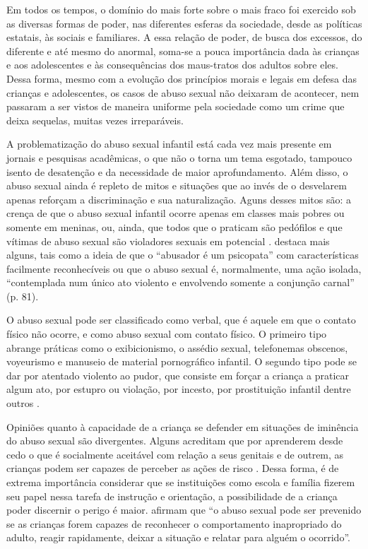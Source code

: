 \begin{citacao}
	Em todos os tempos, o domínio do mais forte sobre o mais fraco foi exercido sob as diversas formas de poder, nas diferentes esferas da sociedade, desde as políticas estatais, às sociais e familiares. A essa relação de poder, de busca dos excessos, do diferente e até mesmo do anormal, soma-se a pouca importância dada às crianças e aos adolescentes e às consequências dos maus-tratos dos adultos sobre eles. Dessa forma, mesmo com a evolução dos princípios morais e legais em defesa das crianças e adolescentes, os casos de abuso sexual não deixaram de acontecer, nem passaram a ser vistos de maneira uniforme pela sociedade como um crime que deixa sequelas, muitas vezes irreparáveis.
\end{citacao}

A problematização do abuso sexual infantil está cada vez mais presente em jornais e pesquisas acadêmicas, o que não o torna um tema esgotado, tampouco isento de desatenção e da necessidade de maior aprofundamento. Além disso, o abuso sexual ainda é repleto de mitos e situações que ao invés de o desvelarem   apenas reforçam a discriminação e sua naturalização. Aguns desses mitos são: a crença de que o abuso sexual infantil ocorre apenas em classes mais pobres ou somente em meninas, ou, ainda, que todos que o praticam são pedófilos e que vítimas de abuso sexual são violadores sexuais em potencial \cite[p. 177]{ALENCAR2009}.  destaca mais alguns, tais como a ideia de que o ``abusador é um psicopata'' com características facilmente reconhecíveis ou que o abuso sexual é, normalmente, uma ação isolada, ``contemplada num único ato violento e envolvendo somente a conjunção carnal'' (p. 81).

O abuso sexual pode ser classificado como verbal, que é aquele em que o contato físico não ocorre, e como abuso sexual com contato físico. O primeiro tipo abrange práticas como o exibicionismo, o assédio sexual, telefonemas obscenos, voyeurismo e manuseio de material pornográfico infantil. O segundo tipo pode se dar por atentado violento ao pudor, que consiste em forçar a criança a praticar algum ato, por estupro ou violação, por incesto, por prostituição infantil dentre outros \cite{VIEIRA2006}.

Opiniões quanto à capacidade de a criança se defender em situações de iminência do abuso sexual são divergentes. Alguns acreditam que por aprenderem desde cedo o que é socialmente aceitável com relação a seus genitais e de outrem, as crianças podem ser capazes de perceber as ações de risco \cite{BRINOWILLIAMS2008}. Dessa forma, é de extrema importância considerar que se instituições como escola e família fizerem seu papel nessa tarefa de instrução e orientação, a possibilidade de a criança poder discernir o perigo é maior.  afirmam que ``o abuso sexual pode ser prevenido se as crianças forem capazes de reconhecer o comportamento inapropriado do adulto, reagir rapidamente, deixar a situação e relatar para alguém o ocorrido''.  

